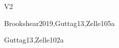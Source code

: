 \begin{syllabus}
\begin{competences}{V2}
    \item {} 
    \item {} 
\end{competences}

\begin{unit}{\SPHistory}{}{Brookshear2019,Guttag13,Zelle10}{5}{a}
    \begin{topics}
        \item \SPHistoryTopicPrehistory
        \item \SPHistoryTopicHistory
        \item \SPHistoryTopicPioneers
        \item \SPHistoryTopicHistoryOf
    \end{topics}
    
    \begin{learningoutcomes}
        \item \SPHistoryLOIdentifySignificant [\Familiarity]
        \item \SPHistoryLOIdentifyTheSeveral [\Familiarity]
        \item \SPHistoryLODiscussTheForLanguage [\Familiarity]
        \item \SPHistoryLOCompareDaily [\Assessment] 
    \end{learningoutcomes}
\end{unit}

\begin{unit}{\PLBasicTypeSystems}{}{Guttag13,Zelle10}{2}{a}
    \begin{topics}
        \item \PLBasicTypeSystemsTopicA
        \item \PLBasicTypeSystemsTopicAssociation
		\item \PLBasicTypeSystemsTopicType
    \end{topics}

    \begin{learningoutcomes}  
		\item \PLBasicTypeSystemsLOForBoth [\Familiarity]  
		\item \PLBasicTypeSystemsLOForA [\Familiarity]
		\item \PLBasicTypeSystemsLODescribeExamples [\Familiarity]
		\item \PLBasicTypeSystemsLOForMultiple [\Usage] 
		\item \PLBasicTypeSystemsLOUseTypes [\Usage] 
		\item \PLBasicTypeSystemsLODefineAndPieces [\Usage] 
    \end{learningoutcomes}
\end{unit}


\end{syllabus}

